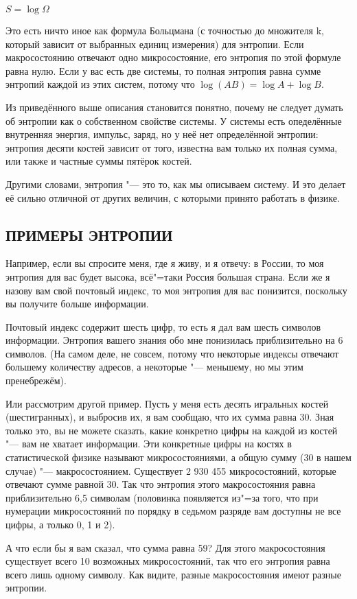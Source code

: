\documentclass[referat, times]{SCWorks}
\begin{document}
$S = \log\Omega$

Это есть ничто иное как формула Больцмана (с точностью до множителя k, который зависит от выбранных единиц измерения) для энтропии. Если макросостоянию отвечают одно микросостояние, его энтропия по этой формуле равна нулю. Если у вас есть две системы, то полная энтропия равна сумме энтропий каждой из этих систем, потому что $\log(AB) = \log A + \log B$.

Из приведённого выше описания становится понятно, почему не следует думать об энтропии как о собственном свойстве системы. У системы есть опеделённые внутренняя энергия, импульс, заряд, но у неё нет определённой энтропии: энтропия десяти костей зависит от того, известна вам только их полная сумма, или также и частные суммы пятёрок костей.

Другими словами, энтропия "--- это то, как мы описываем систему. И это делает её сильно отличной от других величин, с которыми принято работать в физике\cite{primer}.

\subsection{ПРИМЕРЫ ЭНТРОПИИ}
Например, если вы спросите меня, где я живу, и я отвечу: в России, то моя энтропия для вас будет высока, всё"=таки Россия большая страна. Если же я назову вам свой почтовый индекс, то моя энтропия для вас понизится, поскольку вы получите больше информации.

Почтовый индекс содержит шесть цифр, то есть я дал вам шесть символов информации. Энтропия вашего знания обо мне понизилась приблизительно на 6 символов. (На самом деле, не совсем, потому что некоторые индексы отвечают большему количеству адресов, а некоторые "--- меньшему, но мы этим пренебрежём).

Или рассмотрим другой пример. Пусть у меня есть десять игральных костей (шестигранных), и выбросив их, я вам сообщаю, что их сумма равна 30. Зная только это, вы не можете сказать, какие конкретно цифры на каждой из костей "--- вам не хватает информации. Эти конкретные цифры на костях в статистической физике называют микросостояниями, а общую сумму (30 в нашем случае) "--- макросостоянием. Существует 2 930 455 микросостояний, которые отвечают сумме равной 30. Так что энтропия этого макросостояния равна приблизительно 6,5 символам (половинка появляется из"=за того, что при нумерации микросостояний по порядку в седьмом разряде вам доступны не все цифры, а только 0, 1 и 2).

А что если бы я вам сказал, что сумма равна 59? Для этого макросостояния существует всего 10 возможных микросостояний, так что его энтропия равна всего лишь одному символу. Как видите, разные макросостояния имеют разные энтропии.
\end{document}
